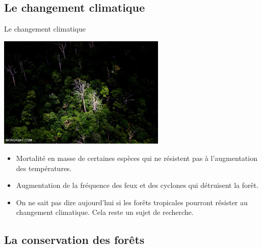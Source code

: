 \documentclass[10pt,table,dvipsnames,compress]{beamer}
\begin{document}
\subsection{Le changement climatique}
\label{sec:org5b5b416}

\begin{frame}[label={sec:org8071374}]{Le changement climatique}
\begin{center}
\includegraphics[width=0.6\textwidth]{figs/sabah_1899-forest-dieback.jpg}
\end{center}

\begin{itemize}
\item Mortalité en masse de certaines espèces qui ne résistent pas à l'augmentation des températures.
\item Augmentation de la fréquence des feux et des cyclones qui détruisent la forêt.
\item On ne sait pas dire aujourd'hui si les forêts tropicales pourront résister au changement climatique. Cela reste un sujet de recherche.
\end{itemize}
\end{frame}
\subsection{La conservation des forêts}
\label{sec:org166304c}
\end{document}
